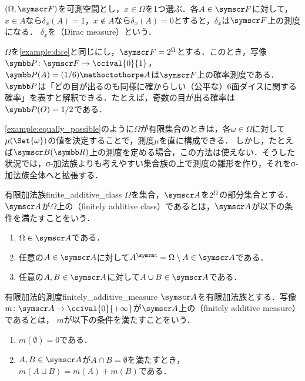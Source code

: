 \documentclass[../../main]{subfiles}
\begin{document}
\begin{example}[ディラック測度]
  \((\Omega,\sigmaalg{F})\)を可測空間とし，\(x\in\Omega\)を1つ選ぶ．各\(A\in\sigmaalg{F}\)に対して，\(x\in A\)なら\(\delta_x(A)=1\)，\(x\notin A\)なら\(\delta_x(A)=0\)とすると，\(\delta_x\)は\(\sigmaalg{F}\)上の測度になる．
  \(\delta_x\)を（Dirac measure）という．
\end{example}

\begin{example}\label{example:equally_possible}
  \(\Omega\)を\cref{example:dice}と同じにし，\(\sigmaalg{F}=\powerset{\Omega}\)とする．このとき，写像\(\prob\colon\sigmaalg{F}\to\ccival{0}{1}\)，\(\prob(A)=(1/6)\sizeof{A}\)は\(\sigmaalg{F}\)上の確率測度である．
  \(\prob\)は「どの目が出るのも同様に確からしい（公平な）6面ダイスに関する確率」を表すと解釈できる．たとえば，奇数の目が出る確率は\(\prob(O)=1/2\)である．
\end{example}

\cref{example:equally_possible}のように\(\Omega\)が有限集合のときは，各\(\omega\in\Omega\)に対して\(\mu(\Set{\omega})\)の値を決定することで，測度\(\mu\)を直に構成できる．
しかし，たとえば\(\sigmaalg{B}(\numset{R})\)上の測度を定める場合，この方法は使えない．そうした状況では，σ‐加法族よりも考えやすい集合族の上で測度の雛形を作り，それをσ‐加法族全体へと拡張する．

\begin{definition}{有限加法族}{finite_additive_class}
  \(\Omega\)を集合，\(\sigmaalg{A}\)を\(2^{\Omega}\)の部分集合とする．
  \(\sigmaalg{A}\)が\(\Omega\)上の（finitely additive class）であるとは，\(\sigmaalg{A}\)が以下の条件を満たすことをいう．
  \begin{enumerate}
    \item \(\Omega\in\sigmaalg{A}\)である．
    \item 任意の\(A\in\sigmaalg{A}\)に対して\(\scomp{A}=\Omega\setminus A\in\sigmaalg{A}\)である．
    \item 任意の\(A,B\in\sigmaalg{A}\)に対して\(A\cup B\in\sigmaalg{A}\)である．
  \end{enumerate}
\end{definition}

\begin{definition}{有限加法的測度}{finitely_additive_measure}
  \(\sigmaalg{A}\)を有限加法族とする．写像\(m\colon\sigmaalg{A}\to\ccival{0}{+\infty}\)が\(\sigmaalg{A}\)上の（finitely additive measure）であるとは，
  \(m\)が以下の条件を満たすことをいう．
  \begin{enumerate}
    \item \(m(\emptyset)=0\)である．
    \item \(A,B\in\sigmaalg{A}\)が\(A\cap B=\emptyset\)を満たすとき，\(m(A\sqcup B)=m(A)+m(B)\)である．
  \end{enumerate}
\end{definition}
\end{document}
